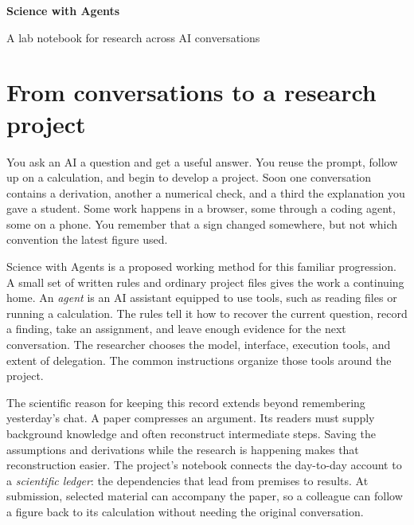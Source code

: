 \documentclass[11pt]{article}
\begin{document}
\begin{center}
{\LARGE\bfseries Science with Agents}\par\smallskip
{\large A lab notebook for research across AI conversations}
\end{center}
\begin{abstract}
Useful AI conversations often grow into research projects whose assumptions and unfinished work are scattered across interfaces. Science with Agents proposes a small written working agreement around existing tools: give each project a continuing notebook, clear responsibilities, and recoverable saved versions. Its scientific ledger preserves the assumptions, conventions, derivations, inputs, and decisions needed to reconstruct the paper's results. Selected evidence becomes a small companion at submission, with private conversations excluded and checks tied to specific result versions. Researchers choose their own models and execution tools; end-to-end operation remains to be validated.
\end{abstract}

\section{From conversations to a research project}
You ask an AI a question and get a useful answer. You reuse the prompt, follow up on a calculation, and begin to develop a project. Soon one conversation contains a derivation, another a numerical check, and a third the explanation you gave a student. Some work happens in a browser, some through a coding agent, some on a phone. You remember that a sign changed somewhere, but not which convention the latest figure used.

Science with Agents is a proposed working method for this familiar progression. A small set of written rules and ordinary project files gives the work a continuing home. An \emph{agent} is an AI assistant equipped to use tools, such as reading files or running a calculation. The rules tell it how to recover the current question, record a finding, take an assignment, and leave enough evidence for the next conversation. The researcher chooses the model, interface, execution tools, and extent of delegation. The common instructions organize those tools around the project.

The scientific reason for keeping this record extends beyond remembering yesterday's chat. A paper compresses an argument. Its readers must supply background knowledge and often reconstruct intermediate steps. Saving the assumptions and derivations while the research is happening makes that reconstruction easier. The project's notebook connects the day-to-day account to a \emph{scientific ledger}: the dependencies that lead from premises to results. At submission, selected material can accompany the paper, so a colleague can follow a figure back to its calculation without needing the original conversation.
\end{document}
